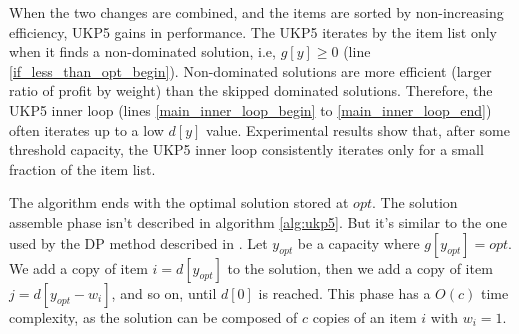 \documentclass[runningheads,a4paper]{llncs}
\begin{document}
When the two changes are combined, and the items are sorted by non-increasing efficiency, UKP5 gains in performance. 
The UKP5 iterates by the item list only when it finds a non-dominated solution, i.e, $g[y] \geq 0$ (line \ref{if_less_than_opt_begin}). 
Non-dominated solutions are more efficient (larger ratio of profit by weight) than the skipped dominated solutions. 
Therefore, the UKP5 inner loop (lines \ref{main_inner_loop_begin} to \ref{main_inner_loop_end}) often iterates up to a low \(d[y]\) value. 
Experimental results show that, after some threshold capacity, the UKP5 inner loop consistently iterates only for a small fraction of the item list.


The algorithm ends with the optimal solution stored at \(opt\). The solution assemble phase isn't described in algorithm \ref{alg:ukp5}. 
But it's similar to the one used by the DP method described in \cite[p. 221, Steps 6-8]{gar72}. 
Let \(y_{opt}\) be a capacity where \(g[y_{opt}] = opt\). We add a copy of item \(i = d[y_{opt}]\) to the solution, then we add a copy of item \(j = d[y_{opt} - w_i]\), and so on, until \(d[0]\) is reached. 
This phase has a \(O(c)\) time complexity, as the solution can be composed of \(c\) copies of an item \(i\) with \(w_i = 1\).

\end{document}
